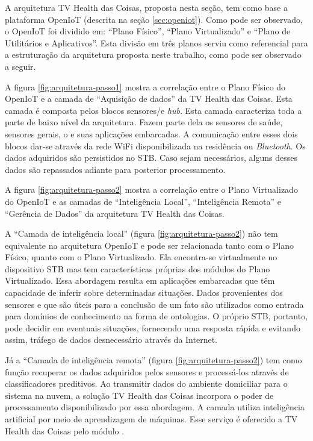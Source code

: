 A arquitetura TV Health das Coisas, proposta nesta seção, tem como base a
plataforma OpenIoT (descrita na seção \vref{sec:openiot}). Como pode ser
observado, o OpenIoT foi dividido em: ``Plano Físico'', ``Plano Virtualizado''
e ``Plano de Utilitários e Aplicativos''. Esta divisão em três planos serviu
como referencial para a estruturação da arquitetura proposta neste trabalho,
como pode ser observado a seguir.

A figura \ref{fig:arquitetura-passo1} mostra a correlação entre o Plano Físico
do OpenIoT e a camada de ``Aquisição de dados'' da TV Health das Coisas. Esta
camada é composta pelos blocos sensores/\smartphones[] e \textit{hub}.  Esta
camada caracteriza toda a parte de baixo nível da arquitetura. Fazem parte dela
os sensores de saúde, sensores gerais, o \stb[] e suas aplicações embarcadas. A
comunicação entre esses dois blocos dar-se através da rede WiFi disponibilizada
na residência ou \textit{Bluetooth}. Os dados adquiridos são persistidos no
STB. Caso sejam necessários, alguns desses dados são repassados adiante para
posterior processamento. 


A figura \ref{fig:arquitetura-passo2} mostra a correlação entre o Plano
Virtualizado do OpenIoT e as camadas de ``Inteligência Local'', ``Inteligência
Remota'' e ``Gerência de Dados'' da arquitetura TV Health das Coisas.


A ``Camada de inteligência local'' (figura \ref{fig:arquitetura-passo2}) não tem equivalente na
arquitetura OpenIoT e pode ser relacionada tanto com o Plano Físico, quanto com
o Plano Virtualizado. Ela encontra-se virtualmente no dispositivo
STB mas tem características próprias dos módulos do Plano Virtualizado.
Essa abordagem resulta em aplicações embarcadas que têm capacidade de inferir sobre
determinadas situações. Dados provenientes dos sensores e que são úteis para a
conclusão de um fato são utilizados como entrada para domínios de conhecimento
na forma de ontologias. O próprio STB, portanto, pode decidir em eventuais
situações, fornecendo uma resposta rápida e evitando assim, tráfego de dados
desnecessário através da Internet.

Já a ``Camada de inteligência remota'' (figura \ref{fig:arquitetura-passo2})
tem como função recuperar os dados adquiridos pelos sensores e processá-los
através de classificadores preditivos.  Ao transmitir dados do ambiente
domiciliar para o sistema na nuvem, a solução TV Health das Coisas incorpora o
poder de processamento disponibilizado por essa abordagem. A camada utiliza
inteligência artificial por meio de aprendizagem de máquinas. Esse serviço é
oferecido a TV Health das Coisas pelo módulo \nextsaude. 

